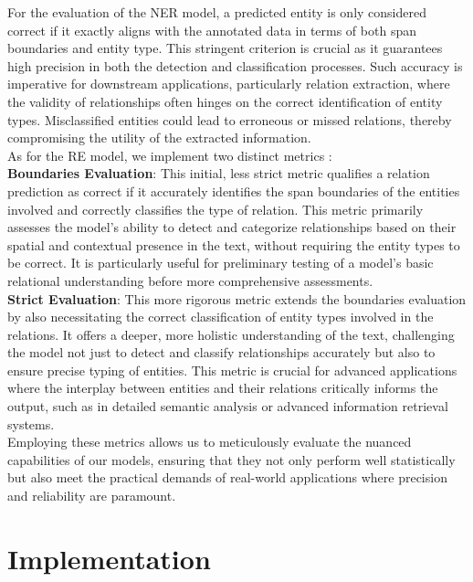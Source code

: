 For the evaluation of the NER model, a predicted entity is only considered correct if it exactly aligns with the annotated data in terms of both span boundaries and entity type. This stringent criterion is crucial as it guarantees high precision in both the detection and classification processes. Such accuracy is imperative for downstream applications, particularly relation extraction, where the validity of relationships often hinges on the correct identification of entity types. Misclassified entities could lead to erroneous or missed relations, thereby compromising the utility of the extracted information.\\

As for the RE model, we implement two distinct metrics \cite{bekoulis-etal-2018-adversarial}:\\
\textbf{Boundaries Evaluation}: This initial, less strict metric qualifies a relation prediction as correct if it accurately identifies the span boundaries of the entities involved and correctly classifies the type of relation. This metric primarily assesses the model's ability to detect and categorize relationships based on their spatial and contextual presence in the text, without requiring the entity types to be correct. It is particularly useful for preliminary testing of a model's basic relational understanding before more comprehensive assessments.\\
\textbf{Strict Evaluation}: This more rigorous metric extends the boundaries evaluation by also necessitating the correct classification of entity types involved in the relations. It offers a deeper, more holistic understanding of the text, challenging the model not just to detect and classify relationships accurately but also to ensure precise typing of entities. This metric is crucial for advanced applications where the interplay between entities and their relations critically informs the output, such as in detailed semantic analysis or advanced information retrieval systems.\\
Employing these metrics allows us to meticulously evaluate the nuanced capabilities of our models, ensuring that they not only perform well statistically but also meet the practical demands of real-world applications where precision and reliability are paramount.

\section{Implementation}

